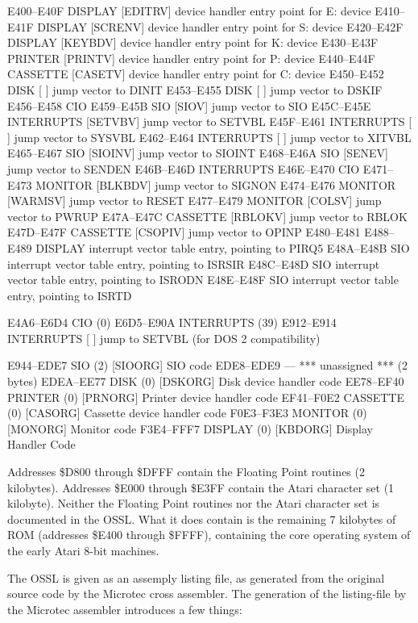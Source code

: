 \documentclass{article}
\begin{document}
E400--E40F DISPLAY        [EDITRV] device handler entry point for E: device
E410--E41F DISPLAY        [SCRENV] device handler entry point for S: device
E420--E42F DISPLAY        [KEYBDV] device handler entry point for K: device
E430--E43F PRINTER        [PRINTV] device handler entry point for P: device
E440--E44F CASSETTE       [CASETV] device handler entry point for C: device
E450--E452 DISK           [      ] jump vector to DINIT
E453--E455 DISK           [      ] jump vector to DSKIF
E456--E458 CIO
E459--E45B SIO            [SIOV]   jump vector to SIO
E45C--E45E INTERRUPTS     [SETVBV] jump vector to SETVBL
E45F--E461 INTERRUPTS     [      ] jump vector to SYSVBL
E462--E464 INTERRUPTS     [      ] jump vector to XITVBL
E465--E467 SIO            [SIOINV] jump vector to SIOINT
E468--E46A SIO            [SENEV]  jump vector to SENDEN
E46B--E46D INTERRUPTS
E46E--E470 CIO
E471--E473 MONITOR        [BLKBDV] jump vector to SIGNON
E474--E476 MONITOR        [WARMSV] jump vector to RESET
E477--E479 MONITOR        [COLSV]  jump vector to PWRUP
E47A--E47C CASSETTE       [RBLOKV] jump vector to RBLOK
E47D--E47F CASSETTE       [CSOPIV] jump vector to OPINP
E480--E481
E488--E489 DISPLAY        interrupt vector table entry, pointing to PIRQ5
E48A--E48B SIO            interrupt vector table entry, pointing to ISRSIR
E48C--E48D SIO            interrupt vector table entry, pointing to ISRODN
E48E--E48F SIO            interrupt vector table entry, pointing to ISRTD

E4A6--E6D4 CIO (0)
E6D5--E90A INTERRUPTS (39)
E912--E914 INTERRUPTS     [     ] jump to SETVBL (for DOS 2 compatibility)

E944--EDE7 SIO (2)      [SIOORG] SIO code
EDE8--EDE9 ---          *** unassigned *** (2 bytes)
EDEA--EE77 DISK (0)     [DSKORG] Disk device handler code
EE78--EF40 PRINTER (0)  [PRNORG] Printer device handler code
EF41--F0E2 CASSETTE (0) [CASORG] Cassette device handler code
F0E3--F3E3 MONITOR (0)  [MONORG] Monitor code
F3E4--FFF7 DISPLAY (0)  [KBDORG] Display Handler Code



Addresses \$D800 through \$DFFF contain the Floating Point routines (2 kilobytes).
Addresses \$E000 through \$E3FF contain the Atari character set (1 kilobyte).
Neither the Floating Point routines nor the Atari character set is documented in the OSSL.
What it does contain  is the remaining 7 kilobytes of ROM (addresses \$E400 through \$FFFF), containing the core operating system of
the early Atari 8-bit machines.

The OSSL is given as an assemply listing file, as generated from the original source code by the Microtec cross assembler.
The generation of the listing-file by the Microtec assembler introduces a few things:
\end{document}
